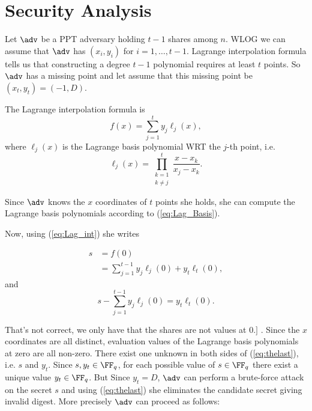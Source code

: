 \documentclass[envcountsame,runningheads,notitlepage]{llncs}
\DeclareRobustCommand{\michals}[2] {{\color{magenta}{$\big[$\scriptsize\textsf{Michal #1:}} #2$\big]$}}
\begin{document}
	\section{Security Analysis}
	Let $\adv$ be a PPT adversary holding $t-1$ shares among $n$. WLOG we can assume that $\adv$ has $(x_{i}, y_{i})$ for $i = 1, \ldots, t-1$. Lagrange interpolation formula tells us that constructing a degree $t - 1$ polynomial requires at least $t$ points. So $\adv$ has a missing point and let assume that this missing point be $(x_{t}, y_{t}) = (-1, D)$.
	
	The Lagrange interpolation formula is
	\begin{equation}\label{eq:Lag_int}
	f(x) = \sum\limits_{j = 1}^{t} y_{j} \ell_{j}(x),
	\end{equation}
	where $\ell_{j}(x)$ is the  Lagrange basis polynomial WRT the $j$-th point, i.e.
	\begin{equation}\label{eq:Lag_Basis}
	\ell_{j}(x) = \prod\limits_{\substack{k = 1 \\ k \neq j}}^{t} \frac{x - x_{k}}{x_{j} - x_{k}}.
	\end{equation}
	
	Since $\adv$ knows the $x$ coordinates of $t$ points she holds, she can compute the Lagrange basis polynomials according to (\ref{eq:Lag_Basis}). 
	
	Now, using (\ref{eq:Lag_int}) she writes
	
	\begin{align*}
	s &= f(0)\\
	&= \sum\limits_{j = 1}^{t-1} y_{j}\ell_{j}(0) + y_{t}\ell_{t}(0),
	\end{align*}
	and 
	\begin{equation}\label{eq:thelast}
	s - \sum\limits_{j = 1}^{t-1} y_{j}\ell_{j}(0) = y_{t}\ell_{t}(0).
	\end{equation}
	
	\michals{12.03.22}{That's not correct, we only have that the shares are not values at 0.} . Since the $x$ coordinates are all distinct, evaluation values of the Lagrange basis polynomials at zero are all non-zero. There exist one unknown in both sides of (\ref{eq:thelast}), i.e. $s$ and $y_{t}$. Since $s, y_{t} \in \FF_q$, for each possible value of $s \in \FF_q$ there exist a unique value $y_{t} \in \FF_q$. But Since $y_{t} = D$, $\adv$ can perform a brute-force attack on the secret $s$ and using (\ref{eq:thelast}) she eliminates the candidate secret giving invalid digest. More precisely $\adv$ can proceed as follows:
	
\end{document}
